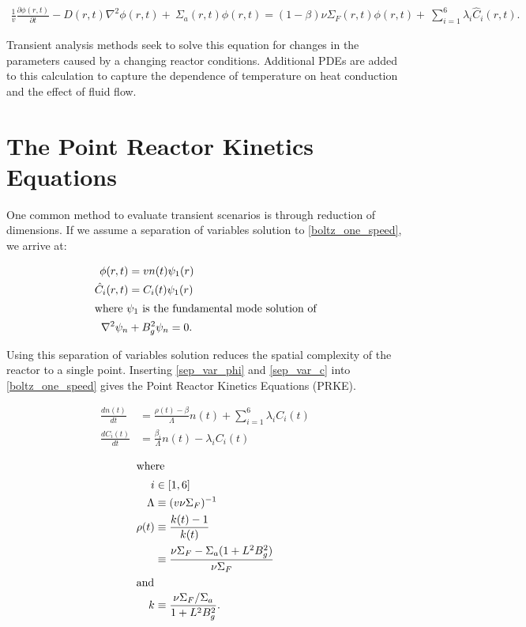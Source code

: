\documentclass[12pt]{article}
\begin{document}
\begin{align}
  \frac{1}{v}\frac{\partial \phi(r,t)}{\partial t} - D(r,t)\nabla^2\phi(r,t) + \
  \Sigma_a(r,t)\phi(r,t) = (1-\beta)\nu\Sigma_F(r,t)\phi(r,t) + \
  \sum_{i=1}^6\lambda_i\hat{C}_i(r,t).
  \label{boltz_one_speed}
\end{align}

Transient analysis methods seek to solve this equation for changes in the
parameters caused by a changing reactor conditions. Additional PDEs are added to
this calculation to capture the dependence of temperature on heat conduction and
the effect of fluid flow.

\section{The Point Reactor Kinetics Equations}

One common method to evaluate transient scenarios is through reduction of 
dimensions. If we assume a separation of variables solution  to 
\eqref{boltz_one_speed}, we arrive at:

\begin{align}
  \phi(r,t) &= vn(t)\psi_1(r) \label{sep_var_phi}\\
  \hat{C}_i(r,t) &= C_i(t)\psi_1(r) \label{sep_var_c}\\
  \intertext{where $\psi_1$ is the fundamental mode solution of}
  \nabla^2\psi_n &+ B_g^2\psi_n = 0.
\end{align}

Using this separation of variables solution reduces the spatial complexity of
the reactor to a single point. Inserting \eqref{sep_var_phi} and
\eqref{sep_var_c} into \eqref{boltz_one_speed} gives the Point Reactor Kinetics Equations (PRKE).

\begin{align}
  \frac{dn(t)}{dt} &= \frac{\rho(t)-\beta}{\Lambda}n(t) + \sum_{i=1}^{6}\lambda_iC_i(t)\\
  \frac{dC_i(t)}{dt} &= \frac{\beta_i}{\Lambda}n(t) - \lambda_i C_i(t)
  \label{prke}
\end{align}

\begin{align}
  \intertext{where}
  i&\in[1,6]\nonumber\\
  \Lambda&\equiv (v\nu\Sigma_F)^{-1}\nonumber\\
  \rho(t) &\equiv\frac{k(t)-1}{k(t)}\nonumber\\
         &\equiv\frac{\nu\Sigma_F-\Sigma_a(1+L^2B_g^2)}{\nu\Sigma_F}\nonumber\\
  \intertext{and}
  k&\equiv \frac{\nu\Sigma_F/\Sigma_a}{1+L^2B_g^2}.\nonumber
\end{align}
\end{document}
